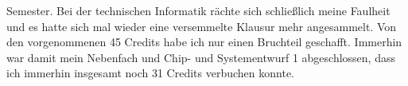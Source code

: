 Semester. Bei der technischen Informatik rächte sich schließlich meine
Faulheit und es hatte sich mal wieder eine versemmelte Klausur mehr angesammelt.
Von den vorgenommenen 45 Credits habe ich nur einen Bruchteil geschafft.
Immerhin war damit mein Nebenfach und Chip- und Systementwurf 1
abgeschlossen, dass ich immerhin insgesamt noch 31 Credits verbuchen
konnte.

